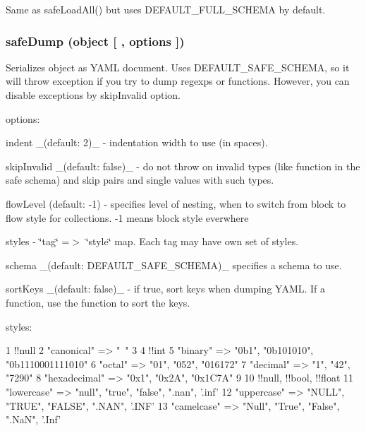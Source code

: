 Same as {\ttfamily safe\+Load\+All()} but uses {\ttfamily D\+E\+F\+A\+U\+L\+T\+\_\+\+F\+U\+L\+L\+\_\+\+S\+C\+H\+E\+M\+A} by default.

\subsubsection*{safe\+Dump (object \mbox{[} , options \mbox{]})}

Serializes {\ttfamily object} as Y\+A\+M\+L document. Uses {\ttfamily D\+E\+F\+A\+U\+L\+T\+\_\+\+S\+A\+F\+E\+\_\+\+S\+C\+H\+E\+M\+A}, so it will throw exception if you try to dump regexps or functions. However, you can disable exceptions by {\ttfamily skip\+Invalid} option.

options\+:


\begin{DoxyItemize}
\item {\ttfamily indent} \+\_\+(default\+: 2)\+\_\+ -\/ indentation width to use (in spaces).
\item {\ttfamily skip\+Invalid} \+\_\+(default\+: false)\+\_\+ -\/ do not throw on invalid types (like function in the safe schema) and skip pairs and single values with such types.
\item {\ttfamily flow\+Level} (default\+: -\/1) -\/ specifies level of nesting, when to switch from block to flow style for collections. -\/1 means block style everwhere
\item {\ttfamily styles} -\/ \char`\"{}tag\char`\"{} =$>$ \char`\"{}style\char`\"{} map. Each tag may have own set of styles.
\item {\ttfamily schema} \+\_\+(default\+: {\ttfamily D\+E\+F\+A\+U\+L\+T\+\_\+\+S\+A\+F\+E\+\_\+\+S\+C\+H\+E\+M\+A})\+\_\+ specifies a schema to use.
\item {\ttfamily sort\+Keys} \+\_\+(default\+: {\ttfamily false})\+\_\+ -\/ if {\ttfamily true}, sort keys when dumping Y\+A\+M\+L. If a function, use the function to sort the keys.
\end{DoxyItemize}

styles\+:


\begin{DoxyCode}
1 !!null
2   "canonical"   => "~"
3 
4 !!int
5   "binary"      => "0b1", "0b101010", "0b1110001111010"
6   "octal"       => "01", "052", "016172"
7   "decimal"     => "1", "42", "7290"
8   "hexadecimal" => "0x1", "0x2A", "0x1C7A"
9 
10 !!null, !!bool, !!float
11   "lowercase"   => "null", "true", "false", ".nan", '.inf'
12   "uppercase"   => "NULL", "TRUE", "FALSE", ".NAN", '.INF'
13   "camelcase"   => "Null", "True", "False", ".NaN", '.Inf'
\end{DoxyCode}



